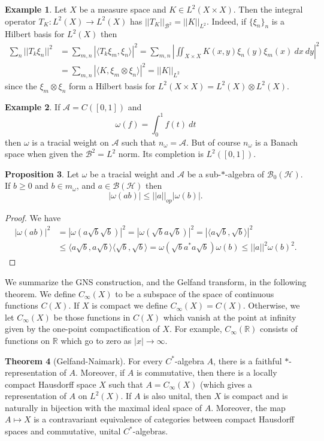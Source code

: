 \documentclass[12pt]{report}
\newcommand{\RR}{\mathbb{R}}
\newcommand{\AAA}{\mathcal A}
\newcommand{\BB}{\mathcal B}
\newcommand{\HH}{\mathcal H}
\theoremstyle{definition}
\newtheorem{theorem}{Theorem}[chapter]
\newtheorem{proposition}[theorem]{Proposition}
\newtheorem{example}[theorem]{Example}
\begin{document}
\begin{example}
    Let $X$ be a measure space and $K \in L^2(X \times X)$. Then the integral operator $T_K: L^2(X) \to L^2(X)$ has $||T_K||_{\BB^2} = ||K||_{L^2}$. Indeed, if $\{\xi_n\}_n$ is a Hilbert basis for $L^2(X)$ then
\begin{align*}
    \sum_n ||T_k\xi_n||^2
        &= \sum_{m,n} |\langle T_k\xi_m, \xi_n\rangle|^2
        = \sum_{m,n} \left|\iint_{X \times X} K(x, y) \xi_n(y) \xi_m(x) ~dx ~dy\right|^2\\
        &= \sum_{m,n} |\langle K, \xi_m \otimes \xi_n\rangle|^2
        = ||K||_{L^2}
\end{align*}
    since the $\xi_m \otimes \xi_n$ form a Hilbert basis for $L^2(X \times X) = L^2(X) \otimes L^2(X)$.
\end{example}
\begin{example}
    If $\AAA = C([0, 1])$ and
    $$\omega(f) = \int_0^1 f(t) ~dt$$
    then $\omega$ is a tracial weight on $\AAA$ such that $n_\omega = \AAA$. But of course $n_\omega$ is a Banach space when given the $\BB^2 = L^2$ norm. Its completion is $L^2([0, 1])$.
\end{example}
\begin{proposition}
    Let $\omega$ be a tracial weight and $\AAA$ be a sub-$*$-algebra of $\BB_0(\HH)$. If $b \geq 0$ and $b \in m_\omega$, and $a \in \BB(\HH)$ then
    $$|\omega(ab)| \leq ||a||_{op}|\omega(b)|.$$
\end{proposition}
\begin{proof}
    We have
\begin{align*}
    |\omega(ab)|^2
        &= |\omega(a \sqrt b \sqrt b)|^2
        = |\omega(\sqrt b a \sqrt b)|^2
        = |\langle a \sqrt b, \sqrt b\rangle|^2\\
        &\leq \langle a\sqrt b, a\sqrt b\rangle \langle \sqrt b, \sqrt b\rangle
        = \omega(\sqrt b a^* a\sqrt b)\omega(b)
        \leq ||a||^2 \omega(b)^2.
\end{align*}
\end{proof}

We summarize the GNS construction, and the Gelfand transform, in the following theorem. We define $C_\infty(X)$ to be a subspace of the space of continuous functions $C(X)$. If $X$ is compact we define $C_\infty(X) = C(X)$. Otherwise, we let $C_\infty(X)$ be those functions in $C(X)$ which vanish at the point at infinity given by the one-point compactification of $X$. For example, $C_\infty(\RR)$ consists of functions on $\RR$ which go to zero as $|x| \to \infty$.
\begin{theorem}[Gelfand-Naimark]
    For every $C^*$-algebra $A$, there is a faithful $*$-representation of $A$. Moreover, if $A$ is commutative, then there is a locally compact Hausdorff space $X$ such that $A = C_\infty(X)$ (which gives a representation of $A$ on $L^2(X)$. If $A$ is also unital, then $X$ is compact and is naturally in bijection with the maximal ideal space of $A$. Moreover, the map $A \mapsto X$ is a contravariant equivalence of categories between compact Hausdorff spaces and commutative, unital $C^*$-algebras.
\end{theorem}
\end{document}
